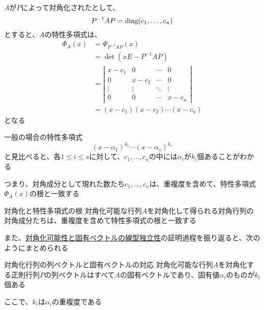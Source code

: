 \documentclass[../../../topic_linear-algebra]{subfiles}
\begin{document}
$A$が$P$によって対角化されたとして、
\begin{equation*}
  P^{-1}AP= \operatorname{diag}(c_1,\ldots, c_n)
\end{equation*}
とすると、$A$の特性多項式は、
\begin{align*}
  \Phi_A(x) & = \Phi_{P^{-1}AP}(x)                          \\
            & = \det(xE - P^{-1}AP)                         \\
            & = \left| \begin{matrix}
                         x - c_1 & 0       & \cdots & 0       \\
                         0       & x - c_2 & \cdots & 0       \\
                         \vdots  & \vdots  & \ddots & \vdots  \\
                         0       & 0       & \cdots & x - c_n
                       \end{matrix} \right| \\
            & = (x - c_1)(x - c_2) \cdots (x - c_n)
\end{align*}
となる

一般の場合の特性多項式
\begin{equation*}
  (x- \alpha_1)^{k_1}\cdots (x - \alpha_s)^{k_s}
\end{equation*}
と見比べると、各$1 \leq i \leq s$に対して、$c_1,\ldots,c_n$の中には$\alpha_i$が$k_i$個あることがわかる

\br

つまり、対角成分として現れた数たち$c_1,\ldots,c_n$は、重複度を含めて、特性多項式$\Phi_A(x)$の根と一致する

\begin{theorem}{対角化と特性多項式の根}
  対角化可能な行列$A$を対角化して得られる対角行列の対角成分たちは、重複度を含めて特性多項式の根と一致する
\end{theorem}

また、\hyperref[thm:diagonalizable-iff-n-indep-eigenvectors]{対角化可能性と固有ベクトルの線型独立性}の証明過程を振り返ると、次のようにまとめられる

\begin{theorem}{対角化行列の列ベクトルと固有ベクトルの対応}\label{thm:diagonalization-columns-are-eigenvectors}
  対角化可能な行列$A$を対角化する正則行列$P$の列ベクトルはすべて$A$の固有ベクトルであり、固有値$\alpha_i$のものが$k_i$個ある

  ここで、$k_i$は$\alpha_i$の重複度である
\end{theorem}
\end{document}
